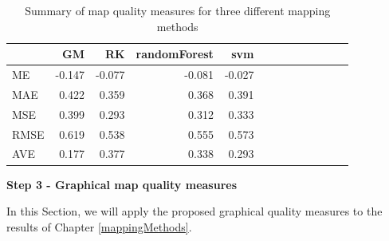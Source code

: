 \documentclass[10pt,b5paper,]{book}
\newenvironment{Shaded}{\begin{snugshade}}{\end{snugshade}}
\newcommand{\DataTypeTok}[1]{\textcolor[rgb]{0.13,0.29,0.53}{#1}}
\newcommand{\DecValTok}[1]{\textcolor[rgb]{0.00,0.00,0.81}{#1}}
\newcommand{\KeywordTok}[1]{\textcolor[rgb]{0.13,0.29,0.53}{\textbf{#1}}}
\newcommand{\NormalTok}[1]{#1}
\newcommand{\OperatorTok}[1]{\textcolor[rgb]{0.81,0.36,0.00}{\textbf{#1}}}
\newcommand{\OtherTok}[1]{\textcolor[rgb]{0.56,0.35,0.01}{#1}}
\newcommand{\StringTok}[1]{\textcolor[rgb]{0.31,0.60,0.02}{#1}}
\theoremstyle{definition}
\theoremstyle{definition}
\theoremstyle{definition}
\theoremstyle{remark}
\begin{document}
\begin{Shaded}
\end{Shaded}

\begin{table}

\caption{\label{tab:unnamed-chunk-88}Summary of map quality measures for three different mapping methods}
\centering
\begin{tabular}[t]{lrrrrrrrrrrrr}
\toprule
  & GM & RK & randomForest & svm\\
\midrule
ME & -0.147 & -0.077 & -0.081 & -0.027\\
MAE & 0.422 & 0.359 & 0.368 & 0.391\\
MSE & 0.399 & 0.293 & 0.312 & 0.333\\
RMSE & 0.619 & 0.538 & 0.555 & 0.573\\
AVE & 0.177 & 0.377 & 0.338 & 0.293\\
\bottomrule
\end{tabular}
\end{table}

\textbf{Step 3 - Graphical map quality measures}

In this Section, we will apply the proposed graphical quality measures
to the results of Chapter \ref{mappingMethods}.
\end{document}
